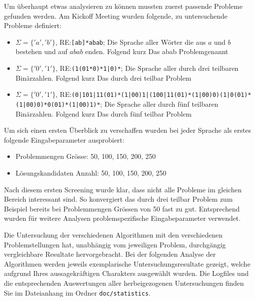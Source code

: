 Um überhaupt etwas analysieren zu können mussten zuerst passende Probleme gefunden werden. Am Kickoff Meeting wurden folgende, zu untersuchende Probleme definiert:
\begin{itemize}
\item $\Sigma=\{'a','b'\}$, RE:\lstinline$[ab]*abab$; Die Sprache aller Wörter die aus $a$ und $b$ bestehen und auf $abab$ enden. Folgend kurz \flqq Das abab Problem\frqq genannt
\item $\Sigma=\{'0','1'\}$, RE:\lstinline$(1(01*0)*1|0)*$; Die Sprache aller durch drei teilbaren Binärzahlen. Folgend kurz \flqq Das durch drei teilbar Problem\frqq
\item $\Sigma=\{'0','1'\}$, RE:\lstinline$(0|101|11(01)*(1|00)1|(100|11(01)*(1|00)0)(1|0(01)*(1|00)0)*0(01)*(1|00)1)*$; Die Sprache aller durch fünf teilbaren Binärzahlen. Folgend kurz \flqq Das durch fünf teilbar Problem \frqq
\end{itemize}

Um sich einen ersten Überblick zu verschaffen wurden bei jeder Sprache als erstes folgende Eingabeparameter ausprobiert:
\begin{itemize}
	\item Problemmengen Grösse: 50, 100, 150, 200, 250
	\item Lösungskandidaten Anzahl: 50, 100, 150, 200, 250
\end{itemize}

Nach diesem ersten Screening wurde klar, dass nicht alle Probleme im gleichen Bereich interessant sind. So konvergiert das durch drei teilbar Problem zum Beispiel bereits bei Problemmengen Grössen von 50 fast zu gut. Entsprechend wurden für weitere Analysen problemspezifische Eingabeparameter verwendet.

Die Untersuchung der verschiedenen Algorithmen mit den verschiedenen Problemstellungen hat, unabhängig vom jeweiligen Problem, durchgängig vergleichbare Resultate hervorgebracht. Bei der folgenden Analyse der Algorithmen werden jeweils exemplarische Untersuchungsresultate gezeigt, welche aufgrund Ihres aussagekräftigen Charakters ausgewählt wurden. Die Logfiles und die entsprechenden Auswertungen aller herbeigezogenen Untersuchungen finden Sie im Dateianhang im Ordner \lstinline$doc/statistics$.